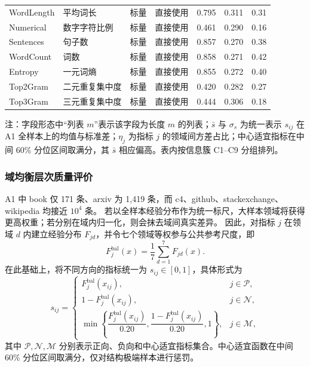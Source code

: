 \documentclass[bwprint]{gmcmthesis}
\newcommand{\TableNote}[2][0.96\textwidth]{%
    \vspace{0.25em}\par
    \begin{minipage}{#1}
    \small\raggedright #2
    \end{minipage}
}
\begin{document}
\begin{table}[htbp]
\begin{tabular}{@{}C{1.80cm} C{2.10cm} C{1.35cm} C{2.55cm} C{1.10cm} C{1.20cm} C{1.20cm}@{}}
        WordLength   & 平均词长       & 标量    & 直接使用                     & 0.795 & 0.311 & 0.31 \\
        Numerical    & 数字字符比例   & 标量    & 直接使用                     & 0.461 & 0.290 & 0.16 \\
        Sentences    & 句子数         & 标量    & 直接使用                     & 0.857 & 0.270 & 0.38 \\
        WordCount    & 词数           & 标量    & 直接使用                     & 0.858 & 0.271 & 0.42 \\
        Entropy      & 一元词熵       & 标量    & 直接使用                     & 0.855 & 0.272 & 0.40 \\
        Top2Gram     & 二元重复集中度 & 标量    & 直接使用                     & 0.420 & 0.282 & 0.27 \\
        Top3Gram     & 三元重复集中度 & 标量    & 直接使用                     & 0.444 & 0.306 & 0.18 \\
        \bottomrule
    \end{tabular}
    \TableNote[0.94\textwidth]{注：字段形态中“列表 $m$”表示该字段为长度 $m$ 的列表；$\bar{s}$ 与 $\sigma_s$ 为统一表示 $s_{ij}$ 在 A1 全样本上的均值与标准差；$\eta_j$ 为指标 $j$ 的领域间方差占比；中心适宜指标在中间 60\% 分位区间取满分，其 $\bar{s}$ 相应偏高。表内按信息簇 C1--C9 分组排列。}
\end{table}

\subsubsection{域均衡层次质量评价}

A1 中 book 仅 171 条、arxiv 为 1,419 条，而 c4、github、stackexchange、wikipedia 均接近 $10^4$ 条。
若以全样本经验分布作为统一标尺，大样本领域将获得更高权重；若分别在域内归一化，则会抹去域间真实差异。
因此，对指标 $j$ 在领域 $d$ 内建立经验分布 $F_{jd}$，并令七个领域等权参与公共参考尺度，即
\begin{equation}
F_j^{\mathrm{bal}}(x)=\frac{1}{7}\sum_{d=1}^{7}F_{jd}(x).
\label{eq:q1_bal_ecdf}
\end{equation}
在此基础上，将不同方向的指标统一为 $s_{ij}\in[0,1]$，具体形式为
\begin{equation}
 s_{ij}=
 \begin{cases}
 F_j^{\mathrm{bal}}(x_{ij}), & j\in\mathcal P,\\[2pt]
 1-F_j^{\mathrm{bal}}(x_{ij}), & j\in\mathcal N,\\[2pt]
 \min\!\left\{\dfrac{F_j^{\mathrm{bal}}(x_{ij})}{0.20},
 \dfrac{1-F_j^{\mathrm{bal}}(x_{ij})}{0.20},1\right\}, & j\in\mathcal M,
 \end{cases}
\label{eq:q1_suitability}
\end{equation}
其中 $\mathcal P,\mathcal N,\mathcal M$ 分别表示正向、负向和中心适宜指标集合。中心适宜函数在中间 60\% 分位区间取满分，仅对结构极端样本进行惩罚。
\end{document}
